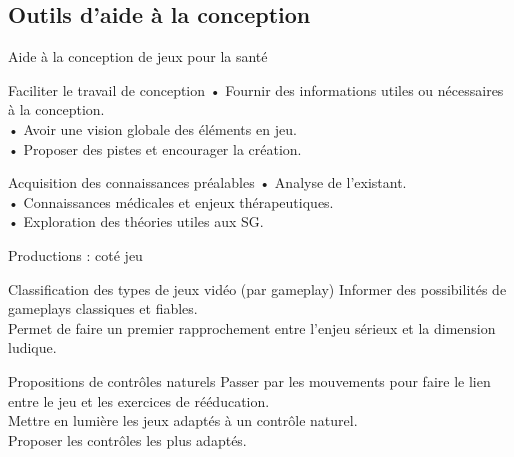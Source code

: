 \documentclass{beamer}
\begin{document}
		
		\subsection{Outils d'aide à la conception}
		\begin{frame}{Aide à la conception de jeux pour la santé}
			\begin{exampleblock}{Faciliter le travail de conception}
			• Fournir des informations utiles ou nécessaires à la conception.\\
			• Avoir une vision globale des éléments en jeu.\\
			• Proposer des pistes et encourager la création.
			\end{exampleblock}\pause
			
			\begin{block}{Acquisition des connaissances préalables}
				• Analyse de l'existant.\\
				• Connaissances médicales et enjeux thérapeutiques.\\
				• Exploration des théories utiles aux SG.				
			\end{block}
		\end{frame}
	
		\begin{frame}{Productions : coté jeu}
			\begin{block}{Classification des types de jeux vidéo (par gameplay)}
				Informer des possibilités de gameplays classiques et fiables.\\
				Permet de faire un premier rapprochement entre l'enjeu sérieux et la dimension ludique.
			\end{block}\pause
			\begin{block}{Propositions de contrôles naturels}
			Passer par les mouvements pour faire le lien entre le jeu et les exercices de rééducation.\\
			Mettre en lumière les jeux adaptés à un contrôle naturel.\\
			Proposer les contrôles les plus adaptés.
			\end{block}			
		\end{frame}
		
\end{document}
